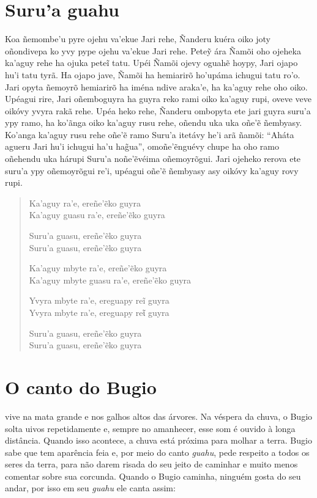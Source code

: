 \chapter{Suru'a guahu}

Koa ñemombe'u pyre ojehu va'ekue Jari rehe, Ñanderu kuéra oiko joty
oñondivepa ko yvy pype ojehu va'ekue Jari rehe. Peteỹ ára Ñamõi oho
ojeheka ka'aguy rehe ha ojuka peteĩ tatu. Upéi Ñamõi ojevy oguahẽ hoypy,
Jari ojapo hu'i tatu tyrã. Ha ojapo jave, Ñamõi ha hemiarirõ ho'upáma
ichugui tatu ro'o. Jari opyta ñemoyrõ hemiarirõ ha iména ndive araka'e,
ha ka'aguy rehe oho oiko. Upéagui rire, Jari oñemboguyra ha guyra reko
rami oiko ka'aguy rupi, oveve veve oikóvy yvyra rakã rehe. Upéa heko
rehe, Ñanderu ombopyta ete jari guyra suru'a ypy ramo, ha ko'ãnga oiko
ka'aguy rusu rehe, oñendu uka uka oñe'ẽ ñembyasy. Ko'anga ka'aguy rusu
rehe oñe'ẽ ramo Suru'a itetávy he'i arã ñamõi: ``Aháta agueru Jari hu'i
ichugui ha'u hag̃ua'', omoñe'ẽnguévy chupe ha oho ramo oñehendu uka
hárupi Suru'a noñe'ẽvéima oñemoyrõgui. Jari ojeheko rerova ete suru'a
ypy oñemoyrõgui re'i, upéagui oñe'ẽ ñembyasy asy oikóvy ka'aguy rovy
rupi.

\begin{verse}
Ka'aguy ra'e, ereñe'ẽko guyra\\
Ka'aguy guasu ra'e, ereñe'ẽko guyra
       
Suru'a guasu, ereñe'ẽko guyra\\
Suru'a guasu, ereñe'ẽko guyra
       
Ka'aguy mbyte ra'e, ereñe'ẽko guyra\\
Ka'aguy mbyte guasu ra'e, ereñe'ẽko guyra
       
Yvyra mbyte ra'e, ereguapy reĩ guyra\\
Yvyra mbyte ra'e, ereguapy reῖ guyra
       
Suru'a guasu, ereñe'ẽko guyra\\
Suru'a guasu, ereñe'ẽko guyra
\end{verse}

\chapter{O canto do Bugio}

 vive na mata grande e nos galhos altos das árvores. Na véspera da
chuva, o Bugio solta uivos repetidamente e, sempre no amanhecer, esse
som é ouvido à longa distância. Quando isso acontece, a chuva está
próxima para molhar a terra. Bugio sabe que tem aparência feia e, por
meio do canto \emph{guahu}, pede respeito a todos os seres da terra,
para não darem risada do seu jeito de caminhar e muito menos comentar
sobre sua corcunda. Quando o Bugio caminha, ninguém gosta do seu andar,
por isso em seu \emph{guahu} ele canta assim:

